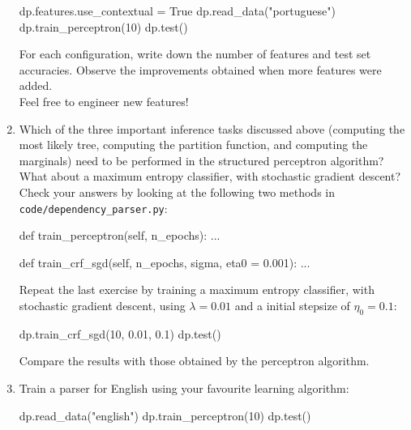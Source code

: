 \begin{exercise}
\begin{enumerate}
\begin{python}
dp.features.use_contextual = True
dp.read_data("portuguese")
dp.train_perceptron(10)
dp.test()
\end{python}
For each configuration, write down the number of features and test set accuracies. 
Observe the improvements obtained when more features were added.\\
Feel free to engineer new features!

\item Which of the three important inference tasks discussed above (computing the most likely tree, 
computing the partition function, and computing the marginals) need to be performed in the structured perceptron algorithm? 
What about a maximum entropy classifier, with stochastic gradient descent?  
Check your answers by looking at the following two methods in {\tt code/dependency\_parser.py}:\\
\begin{python}
def train_perceptron(self, n_epochs):
...

def train_crf_sgd(self, n_epochs, sigma, eta0 = 0.001):
...
\end{python}
Repeat the last exercise by training a maximum entropy classifier, with stochastic gradient descent, 
using $\lambda = 0.01$ and a initial stepsize of $\eta_0 = 0.1$: 
\begin{python}
dp.train_crf_sgd(10, 0.01, 0.1)
dp.test()
\end{python}
Compare the results with those obtained by the perceptron algorithm.\\

\item Train a parser for English using your favourite learning algorithm: 
\begin{python}
dp.read_data("english")
dp.train_perceptron(10)
dp.test()
\end{python}


\end{enumerate}
\end{exercise}
